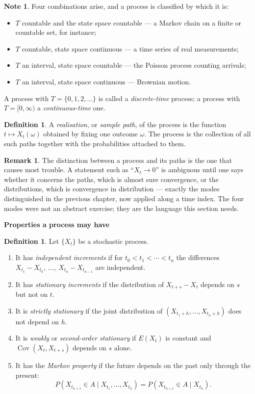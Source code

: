 \documentclass[11pt,a4paper]{article}
\theoremstyle{definition}
\newtheorem{defn}[thm]{Definition}
\newtheorem*{note}{Note}
\newtheorem*{remark}{Remark}
\newcommand{\subhead}[1]{%
  \par\medskip\noindent\textbf{#1}\par\nobreak\smallskip}
\DeclareMathOperator{\Cov}{Cov}
\begin{document}
\begin{note}
Four combinations arise, and a process is classified by which it is:
\begin{itemize}
\item $T$ countable and the state space countable --- a Markov chain on a
finite or countable set, for instance;
\item $T$ countable, state space continuous --- a time series of real
measurements;
\item $T$ an interval, state space countable --- the Poisson process
counting arrivals;
\item $T$ an interval, state space continuous --- Brownian motion.
\end{itemize}
A process with $T = \{0,1,2,\dots\}$ is called a \emph{discrete-time} process; a
process with $T = [0,\infty)$ a \emph{continuous-time} one.
\end{note}

\begin{defn}
A \emph{realisation}, or \emph{sample path}, of the process is the function
$t\mapsto X_t(\omega)$ obtained by fixing one outcome $\omega$. The process is
the collection of all such paths together with the probabilities attached to
them.
\end{defn}

\begin{remark}
The distinction between a process and its paths is the one that causes most
trouble. A statement such as ``$X_t\rightarrow0$'' is ambiguous until one says
whether it concerns the paths, which is almost sure convergence, or the
distributions, which is convergence in distribution --- exactly the modes
distinguished in the previous chapter, now applied along a time index. The four
modes were not an abstract exercise; they are the language this section needs.
\end{remark}

\subhead{Properties a process may have}

\begin{defn}
Let $\{X_t\}$ be a stochastic process.
\begin{enumerate}[label=(\roman*)]
\item It has \emph{independent increments} if for
$t_0<t_1<\cdots<t_n$ the differences
$X_{t_1}-X_{t_0},\ \dots,\ X_{t_n}-X_{t_{n-1}}$ are independent.
\item It has \emph{stationary increments} if the distribution of
$X_{t+s}-X_{t}$ depends on $s$ but not on $t$.
\item It is \emph{strictly stationary} if the joint distribution of
$\left(X_{t_1+h},\dots,X_{t_n+h}\right)$ does not depend on $h$.
\item It is \emph{weakly} or \emph{second-order stationary} if $E(X_t)$ is
constant and $\Cov\left(X_t,X_{t+s}\right)$ depends on $s$ alone.
\item It has the \emph{Markov property} if the future depends on the past
only through the present:
$$P\left(X_{t_{n+1}}\in A \mid X_{t_1},\dots,X_{t_n}\right)
= P\left(X_{t_{n+1}}\in A \mid X_{t_n}\right).$$
\end{enumerate}
\end{defn}
\end{document}
